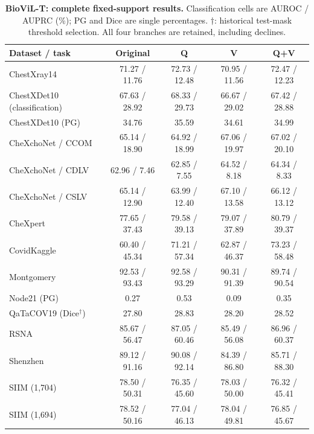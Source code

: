 \begin{table}[tp]
\centering
\caption{\textbf{BioViL-T: complete fixed-support results.} Classification cells are AUROC / AUPRC (\%); PG and Dice are single percentages. $\dagger$: historical test-mask threshold selection. All four branches are retained, including declines.}
\label{tab:supp-fixed-biovil-t}
\small
\setlength{\tabcolsep}{4pt}
\begin{tabular*}{\textwidth}{@{\extracolsep{\fill}}lcccc@{}}
\toprule
Dataset / task & Original & Q & V & Q+V \\
\midrule
ChestXray14 & 71.27 / 11.76 & 72.73 / 12.48 & 70.95 / 11.56 & 72.47 / 12.23 \\
ChestXDet10 (classification) & 67.63 / 28.92 & 68.33 / 29.73 & 66.67 / 29.02 & 67.42 / 28.88 \\
ChestXDet10 (PG) & 34.76 & 35.59 & 34.61 & 34.99 \\
CheXchoNet / CCOM & 65.14 / 18.90 & 64.92 / 18.99 & 67.06 / 19.97 & 67.02 / 20.10 \\
CheXchoNet / CDLV & 62.96 / 7.46 & 62.85 / 7.55 & 64.52 / 8.18 & 64.34 / 8.33 \\
CheXchoNet / CSLV & 65.14 / 12.90 & 63.99 / 12.40 & 67.10 / 13.58 & 66.12 / 13.12 \\
CheXpert & 77.65 / 37.43 & 79.58 / 39.13 & 79.07 / 37.89 & 80.79 / 39.37 \\
CovidKaggle & 60.40 / 45.34 & 71.21 / 57.34 & 62.87 / 46.37 & 73.23 / 58.48 \\
Montgomery & 92.53 / 93.43 & 92.58 / 93.29 & 90.31 / 91.39 & 89.74 / 90.54 \\
Node21 (PG) & 0.27 & 0.53 & 0.09 & 0.35 \\
QaTaCOV19 (Dice$^\dagger$) & 27.80 & 28.83 & 28.20 & 28.52 \\
RSNA & 85.67 / 56.47 & 87.05 / 60.46 & 85.49 / 56.08 & 86.96 / 60.37 \\
Shenzhen & 89.12 / 91.16 & 90.08 / 92.14 & 84.39 / 86.80 & 85.71 / 88.30 \\
SIIM (1,704) & 78.50 / 50.31 & 76.35 / 45.60 & 78.03 / 50.00 & 76.32 / 45.41 \\
SIIM (1,694) & 78.52 / 50.16 & 77.04 / 46.13 & 78.04 / 49.81 & 76.85 / 45.67 \\
\bottomrule
\end{tabular*}
\end{table}

